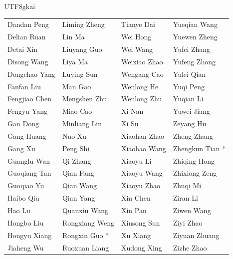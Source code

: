 \documentclass{article}
\begin{document}
\begin{CJK}{UTF8}{gkai}
\begin{tabular}{p{}p{}p{}p{}}
Dandan Peng & Liming Zheng & Tianye Dai & Yueqian Wang \\
Delian Ruan & Lin Ma & Wei Hong & Yuewen Zheng \\
Detai Xin & Liuyang Guo & Wei Wang & Yufei Zhang \\
Disong Wang & Liya Ma & Weixiao Zhao & Yufeng Zhong \\
Dongchao Yang & Luying Sun & Wengang Cao & Yulei Qian \\
Fanfan Liu & Man Gao & Wenlong He & Yuqi Peng \\
Fengjiao Chen & Mengshen Zhu & Wenlong Zhu & Yuqian Li \\
Fengyu Yang & Miao Cao & Xi Nan & Yuwei Jiang \\
Gan Dong & Minliang Lin & Xi Su & Zeyang Hu \\
Gang Huang & Nuo Xu & Xiaohan Zhao & Zheng Zhang \\
Gang Xu & Peng Shi & Xiaohao Wang & Zhengkun Tian * \\
Guanglu Wan & Qi Zhang & Xiaoyu Li & Zhiqing Hong \\
Guoqiang Tan & Qian Fang & Xiaoyu Wang & Zhixiong Zeng \\
Guoqiao Yu & Qian Wang & Xiaoyu Zhao & Zhuqi Mi \\
Haibo Qiu & Qian Yang & Xin Chen & Ziran Li \\
Hao Lu & Quanxiu Wang & Xin Pan & Ziwen Wang \\
Hongbo Liu & Rongxiang Weng & Xiusong Sun & Ziyi Zhao \\
Hongyu Xiang & Rongxin Guo * & Xu Xiang & Ziyuan Zhuang \\
Jiaheng Wu & Ruoxuan Liang & Xudong Xing & Zizhe Zhao \\
\end{tabular}
\end{CJK}

\clearpage


  

\clearpage

\end{document}
